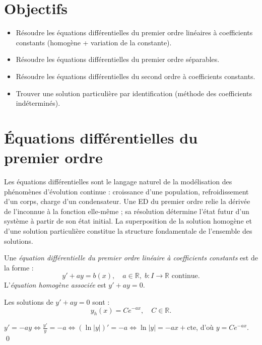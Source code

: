 \documentclass[11pt,a4paper,twoside]{book}
\newcommand{\R}{\mathbb{R}}
\begin{document}
\section*{Objectifs}
\begin{itemize}[leftmargin=1.5em]
  \item Résoudre les équations différentielles du premier ordre linéaires à coefficients constants (homogène + variation de la constante).
  \item Résoudre les équations différentielles du premier ordre séparables.
  \item Résoudre les équations différentielles du second ordre à coefficients constants.
  \item Trouver une solution particulière par identification (méthode des coefficients indéterminés).
\end{itemize}

\section{Équations différentielles du premier ordre}

Les équations différentielles sont le langage naturel de la modélisation des phénomènes d'évolution continue : croissance d'une population, refroidissement d'un corps, charge d'un condensateur. Une ED du premier ordre relie la dérivée de l'inconnue à la fonction elle-même ; sa résolution détermine l'état futur d'un système à partir de son état initial. La superposition de la solution homogène et d'une solution particulière constitue la structure fondamentale de l'ensemble des solutions.

\begin{definitionbox}
Une \emph{équation différentielle du premier ordre linéaire à coefficients constants} est de la forme :
\[
  y' + ay = b(x), \quad a \in \R,\; b : I \to \R \text{ continue}.
\]
L'\emph{équation homogène associée} est $y' + ay = 0$.
\end{definitionbox}

\begin{theoremebox}
Les solutions de $y' + ay = 0$ sont :
\[
  y_h(x) = C e^{-ax}, \quad C \in \R.
\]
\end{theoremebox}

\begin{preuvebox}
$y' = -ay \iff \frac{y'}{y} = -a \iff (\ln|y|)' = -a \iff \ln|y| = -ax + \mathrm{cte}$, d'où $y = Ce^{-ax}$. \qed
\end{preuvebox}
\end{document}
